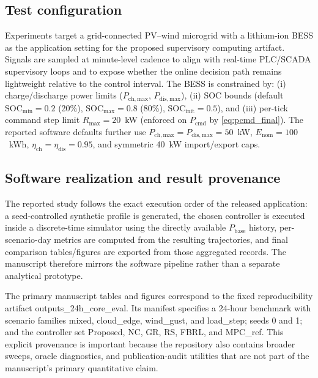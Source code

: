 \documentclass[preprint,12pt]{elsarticle}
\def\texttt#1{#1}%
\newcommand{\Rmax}{R_{\max}}
\newcommand{\SOC}{\mathrm{SOC}}
\newcommand{\Pcmd}{P_{\mathrm{cmd}}}
\newcommand{\Pbase}{P_{\mathrm{base}}}
\begin{document}
\subsection{Test configuration}
Experiments target a grid-connected PV--wind microgrid with a lithium-ion BESS as the application setting for the proposed supervisory computing artifact.
Signals are sampled at minute-level cadence to align with real-time PLC/SCADA supervisory loops and to expose whether the online decision path remains lightweight relative to the control interval.
The BESS is constrained by:
(i) charge/discharge power limits ($P_{\mathrm{ch,max}}$, $P_{\mathrm{dis,max}}$),
(ii) SOC bounds (default $\SOC_{\min}=0.2$ (20\%), $\SOC_{\max}=0.8$ (80\%), $\SOC_{\mathrm{init}}=0.5$), and
(iii) per-tick command step limit $\Rmax=20$~kW (enforced on $\Pcmd$ by \eqref{eq:pcmd_final}). The reported software defaults further use $P_{\mathrm{ch,max}}=P_{\mathrm{dis,max}}=50$~kW, $E_{\mathrm{nom}}=100$~kWh, $\eta_{\mathrm{ch}}=\eta_{\mathrm{dis}}=0.95$, and symmetric 40~kW import/export caps.

\subsection{Software realization and result provenance}
The reported study follows the exact execution order of the released application: a seed-controlled synthetic profile is generated, the chosen controller is executed inside a discrete-time simulator using the directly available $\Pbase$ history, per-scenario-day metrics are computed from the resulting trajectories, and final comparison tables/figures are exported from those aggregated records. The manuscript therefore mirrors the software pipeline rather than a separate analytical prototype.

The primary manuscript tables and figures correspond to the fixed reproducibility artifact \texttt{outputs\_24h\_core\_eval}. Its manifest specifies a 24-hour benchmark with scenario families \texttt{mixed}, \texttt{cloud\_edge}, \texttt{wind\_gust}, and \texttt{load\_step}; seeds 0 and 1; and the controller set \texttt{Proposed}, \texttt{NC}, \texttt{GR}, \texttt{RS}, \texttt{FBRL}, and \texttt{MPC\_ref}. This explicit provenance is important because the repository also contains broader sweeps, oracle diagnostics, and publication-audit utilities that are not part of the manuscript's primary quantitative claim.
\end{document}
